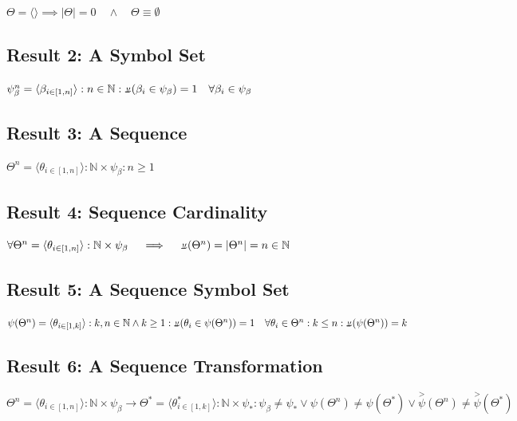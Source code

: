 \documentclass[a4paper, 18pt]{book} %
\newcommand{\invpi}{\rotatebox[origin=c]{180}{$\pi$}}
\begin{document}
$\Theta = \langle \rangle \implies |\Theta| = 0 \quad \land \quad \Theta \equiv \emptyset$

\subsection{Result 2: A Symbol Set\cite{Lutalo2024gtnc}}

$\psi_\beta^n = \langle \beta_{i \in [1,n]} \rangle : n \in \mathbb{N} : \invpi(\beta_i \in \psi_\beta) = 1 \quad \forall \beta_i \in \psi_\beta$

\subsection{Result 3: A Sequence\cite{lnspaper}}
\label{RES3}

$\Theta^n = \langle \theta_{i \in [1,n]} \rangle : \mathbb{N} \times \psi_\beta : n \geq 1$

\subsection{Result 4: Sequence Cardinality\cite{adtpaper}\cite{Lutalo2024gtnc}}
\label{RES4}

$\forall \Theta^n = \langle \theta_{i \in [1,n]} \rangle : \mathbb{N} \times \psi_\beta \quad \implies \quad \invpi(\Theta^n) = |\Theta^n| = n \in \mathbb{N}$ 



\subsection{Result 5: A Sequence Symbol Set\cite{ossipaper}\cite{Lutalo2024gtnc}}
\label{RES5}

$\psi(\Theta^n) = \langle \theta_{i \in [1,k]} \rangle : k,n \in \mathbb{N} \land k \geq 1 : \invpi(\theta_i \in \psi(\Theta^n)) = 1 \quad \forall \theta_i \in \Theta^n : k \leq n : \invpi(\psi(\Theta^n)) = k$


\subsection{Result 6: A Sequence Transformation\cite{transformatics}\cite{lnspaper}}

$\Theta^n = \langle \theta_{i \in [1,n]} \rangle : \mathbb{N} \times \psi_\beta \rightarrow \Theta^* = \langle \theta^*_{i \in [1,k]} \rangle : \mathbb{N} \times \psi_* : \psi_\beta \neq \psi_{*} \lor \psi(\Theta^n) \neq \psi(\Theta^*) \lor \overset{>}{\psi}(\Theta^n) \neq \overset{>}{\psi}(\Theta^*)$
\end{document}
